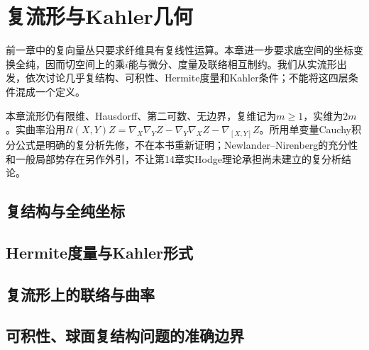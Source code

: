 \chapter{复流形与Kahler几何}
\label{ch:17-complex}

前一章中的复向量丛只要求纤维具有复线性运算。本章进一步要求底空间的坐标变换全纯，因而切空间上的乘$i$能与微分、度量及联络相互制约。我们从实流形出发，依次讨论几乎复结构、可积性、Hermite度量和Kahler条件；不能将这四层条件混成一个定义。

本章流形仍有限维、Hausdorff、第二可数、无边界，复维记为$m\geq1$，实维为$2m$。实曲率沿用$R(X,Y)Z=\nabla_X\nabla_YZ-\nabla_Y\nabla_XZ-\nabla_{[X,Y]}Z$。所用单变量Cauchy积分公式是明确的复分析先修，不在本书重新证明；Newlander--Nirenberg的充分性和一般局部势存在另作外引，不让第14章实Hodge理论承担尚未建立的复分析结论。

\section{复结构与全纯坐标}



\section{Hermite度量与Kahler形式}



\section{复流形上的联络与曲率}



\section{可积性、球面复结构问题的准确边界}




